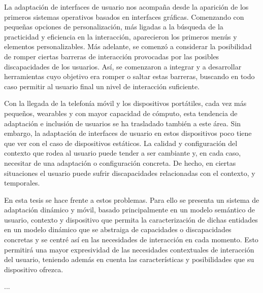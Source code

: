 \begin{resumen} %

La adaptación de interfaces de usuario nos acompaña desde la aparición de los
primeros sistemas operativos basados en interfaces gráficas. Comenzando con
pequeñas opciones de personalización, más ligadas a la búsqueda de la practicidad
y eficiencia en la interacción, aparecieron los primeros menús y elementos
personalizables. Más adelante, se comenzó a considerar la posibilidad de romper
ciertas barreras de interacción provocadas por las posibles discapacidades de
los usuarios. Así, se comenzaron a integrar y a desarrollar herramientas cuyo
objetivo era romper o saltar estas barreras, buscando en todo caso permitir al
usuario final un nivel de interacción suficiente.

Con la llegada de la telefonía móvil y los dispositivos portátiles, cada vez
más pequeños, wearables y con mayor capacidad de cómputo, esta tendencia de 
adaptación e inclusión de usuarios se ha trasladado también a este área. Sin
embargo, la adaptación de interfaces de usuario en estos dispositivos poco
tiene que ver con el caso de dispositivos estáticos. La calidad y configuración
del contexto que rodea al usuario puede tender a ser cambiante y, en cada caso,
necesitar de una adaptación o configuración concreta. De hecho, en ciertas
situaciones el usuario puede sufrir discapacidades relacionadas con el contexto,
y temporales. 

En esta tesis se hace frente a estos problemas. Para ello se presenta un sistema
de adaptación dinámico y móvil, basado principalmente en un modelo semántico de
usuario, contexto y dispositivo que permita la caracterización de dichas
entidades en un modelo dinámico que se abstraiga de capacidades o discapacidades
concretas y se centré así en las necesidades de interacción en cada momento.
Esto permitirá una mayor expresividad de las necesidades contextuales de
interacción del usuario, teniendo además en cuenta las características y
posibilidades que su dispositivo ofrezca.


\end{resumen}


\begin{laburpena}        %


...




\end{laburpena}




